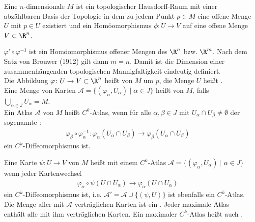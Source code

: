 \begin{dfn*}
  Eine $n$-dimensionale  $M$ ist ein topologischer Hausdorff-Raum mit einer abzählbaren Basis der Topologie in dem zu jedem Punkt $p \in M$ eine offene Menge $U$ mit $p \in U$ existiert und ein Homöomorphismus $\phi \colon U \to V$ auf eine offene Menge $V \subset \R^{n}$.


  $\varphi' \circ \varphi^{-1}$ ist ein Homöomorphismus offener Mengen des $\R^n$ bzw. $\R^m$. Nach dem Satz von Brouwer (1912) gilt dann $m = n$. Damit ist die Dimension einer zusammenhängenden topologischen Mannigfaltigkeit eindeutig definiert.\\

  Die Abbildung $\varphi \colon U \to V \subset \R^n$ heißt  von $M$ um $p$, die Menge $U$ heißt .\\

  Eine Menge von Karten $\mathcal A = \{(\varphi_{\alpha}, U_{\alpha}) \mid \alpha \in J \}$ heißt  von $M$, falls $\bigcup_{\alpha \in J}U_{\alpha} = M$.\\

  Ein Atlas $\mathcal A$ von $M$ heißt $C^k$-Atlas, wenn für alle $\alpha, \beta \in J$ mit $U_{\alpha} \cap U_{\beta} \neq \emptyset$ der sogenannte :
  \begin{align*}
    \varphi_{\beta} \circ \varphi_{\alpha}^{-1}\colon \varphi_{\alpha}(U_{\alpha} \cap U_{\beta}) \to \varphi_{\beta}(U_{\alpha} \cap U_{\beta})
  \end{align*}
  ein $C^k$-Diffeomorphismus ist.\\



  Eine Karte $\psi \colon U \to V$ von $M$ heißt  mit einem $C^k$-Atlas $\mathcal A = \{(\varphi_{\alpha},U_{\alpha}) \mid \alpha \in J\}$ wenn jeder Kartenwechsel
  \begin{align*}
    \varphi_{\alpha} \circ \psi(U \cap U_{\alpha}) \to \varphi_{\alpha}(U \cap U_{\alpha})
  \end{align*}
  ein $C^k$-Diffeomorphismus ist, i.e. $\mathcal A' = \mathcal A \cup \{(\psi, U)\}$ ist ebenfalls ein $C^k$-Atlas.\\

  Die Menge aller mit $\mathcal A$ verträglichen Karten ist ein . Jeder maximale Atlas enthält alle mit ihm verträglichen Karten. Ein maximaler $C^k$-Atlas heißt auch .

\end{dfn*}

